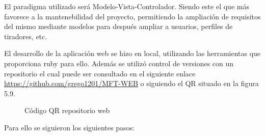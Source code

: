 El paradigma utilizado será Modelo-Vista-Controlador. Siendo este el que más
favorece a la mantenebilidad del proyecto, permitiendo la ampliación de requisitos
del mismo mediante modelos para después ampliar a usuarios, perfiles de tiradores,
etc.

El desarrollo de la aplicación web se hizo en local, utilizando las herramientas
que proporciona ruby para ello. Además se utilizó control de versiones con un repositorio
el cual puede ser consultado en el siguiente enlace \url{https://github.com/grego1201/MFT-WEB}
o siguiendo el QR situado en la figura 5.9.

\begin{figure}[htb]
  \centering
  \caption[Código QR repositorio web]{Código QR repositorio web}
  \label{fig:Código QR repositorio web}
\end{figure}

Para ello se siguieron los siguientes pasos:

